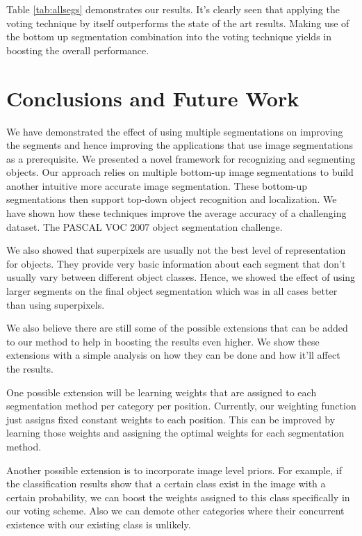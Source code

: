 \documentclass[10pt,twocolumn,letterpaper]{article}
\begin{document}
Table \ref{tab:allsegs} demonstrates our results. It's clearly seen that applying the voting technique by itself
outperforms the state of the art results. Making use of the bottom up segmentation combination into the voting
technique yields in boosting the overall performance.

\section{Conclusions and Future Work}\label{sectionConclusions}

We have demonstrated the effect of using multiple segmentations on improving
the segments and hence improving the applications that use image
segmentations as a prerequisite. We presented a novel framework for recognizing
and segmenting objects. Our approach relies on multiple bottom-up image 
segmentations to build another intuitive more accurate image segmentation.
These bottom-up segmentations then support top-down object recognition
and localization. We have shown how these techniques improve the average accuracy
of a challenging dataset. The PASCAL VOC 2007 object segmentation challenge.

We also showed that superpixels are usually not the best level of representation
for objects. They provide very basic information about each segment that don't
usually vary between different object classes. Hence, we showed the effect of
using larger segments on the final object segmentation which was in all cases
better than using superpixels.

We also believe there are still some of the possible extensions that can be added
to our method to help in boosting the results even higher. We show these extensions
with a simple analysis on how they can be done and how it'll affect the results.

One possible extension will be learning weights that are assigned to each segmentation method per category per position.
Currently, our weighting function just assigns fixed constant weights to each position. This can be improved by
learning those weights and assigning the optimal weights for each segmentation method.

Another possible extension is to incorporate image level priors. For example, if the classification
results show that a certain class exist in the image with a certain probability, we can boost the
weights assigned to this class specifically in our voting scheme. Also we can demote other categories
where their concurrent existence with our existing class is unlikely.
\end{document}
